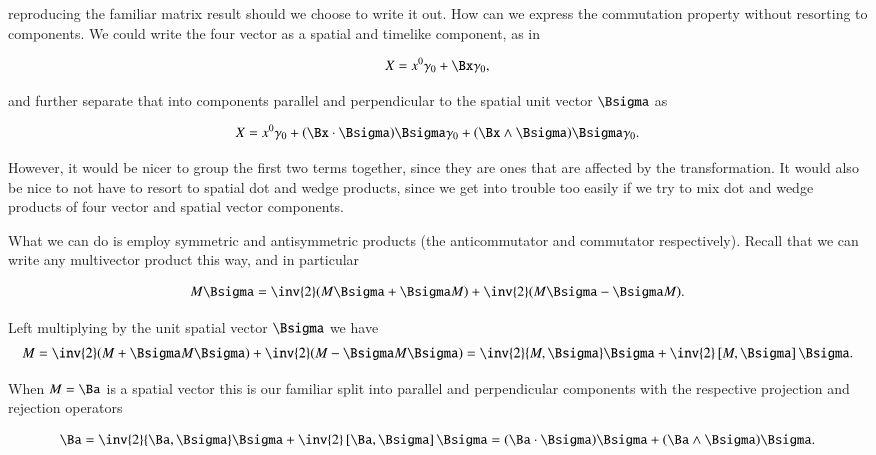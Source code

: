 reproducing the familiar matrix result should we choose to write it out.  How can we express the commutation property without resorting to components.  We could write the four vector as a spatial and timelike component, as in

\begin{align}\label{eqn:boostCommutator:4}
X = x^0 \gamma_0 + \Bx \gamma_0,
\end{align}

and further separate that into components parallel and perpendicular to the spatial unit vector $\Bsigma$ as

\begin{align}\label{eqn:boostCommutator:5}
X = x^0 \gamma_0 + (\Bx \cdot \Bsigma) \Bsigma \gamma_0 + (\Bx \wedge \Bsigma) \Bsigma \gamma_0.
\end{align}

However, it would be nicer to group the first two terms together, since they are ones that are affected by the transformation.  It would also be nice to not have to resort to spatial dot and wedge products, since we get into trouble too easily if we try to mix dot and wedge products of four vector and spatial vector components.  

What we can do is employ symmetric and antisymmetric products (the anticommutator and commutator respectively).  Recall that we can write any multivector product this way, and in particular

\begin{align}\label{eqn:boostCommutator:6}
M \Bsigma = \inv{2} (M \Bsigma  + \Bsigma M) + \inv{2} (M \Bsigma - \Bsigma M).
\end{align}

Left multiplying by the unit spatial vector $\Bsigma$ we have
\begin{align}\label{eqn:boostCommutator:7}
M = \inv{2} (M + \Bsigma M \Bsigma) + \inv{2} (M - \Bsigma M \Bsigma) = 
\inv{2} \symmetric{M}{\Bsigma} \Bsigma + \inv{2} \antisymmetric{M}{\Bsigma} \Bsigma.
\end{align}

When $M = \Ba$ is a spatial vector this is our familiar split into parallel and perpendicular components with the respective projection and rejection operators

\begin{align}\label{eqn:boostCommutator:8}
\Ba = \inv{2} \symmetric{\Ba}{\Bsigma} \Bsigma + \inv{2} \antisymmetric{\Ba}{\Bsigma} \Bsigma = (\Ba \cdot \Bsigma) \Bsigma + (\Ba \wedge \Bsigma) \Bsigma.
\end{align}

